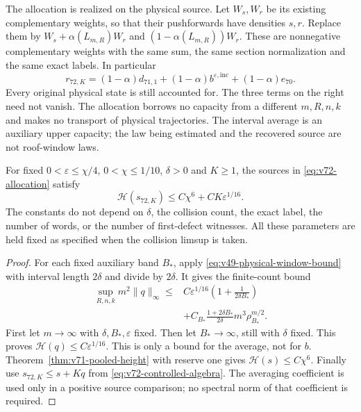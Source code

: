 The allocation is realized on the physical source. Let $W_s,W_r$
be its existing complementary weights, so that their pushforwards
have densities $s,r$. Replace them by
$W_s+\alpha(L_{m,R})W_r$ and
$(1-\alpha(L_{m,R}))W_r$. These are nonnegative complementary
weights with the same sum, the same section normalization and the
same exact labels. In particular
\begin{equation}\label{eq:v72-three-residuals}
 r_{72,K}=(1-\alpha)d_{71,1}
       +(1-\alpha)b^{\varepsilon,\mathrm{inc}}+(1-\alpha)e_{70}.
\end{equation}
Every original physical state is still accounted for. The three terms
on the right need not vanish. The allocation borrows no capacity from
a different $m,R,n,k$ and makes no transport of physical trajectories.
The interval average is an auxiliary upper capacity; the law being
estimated and the recovered source are not roof-window laws.

\begin{theorem}
\label{thm:v72-global-recovery}
For fixed $0<\varepsilon\le\chi/4$, $0<\chi\le1/10$,
$\delta>0$ and $K\ge1$, the sources in
\eqref{eq:v72-allocation} satisfy
\begin{equation}\label{eq:v72-global-controlled-height}
 \mathcal H(s_{72,K})\le C\chi^6+CK\varepsilon^{1/16}.
\end{equation}
The constants do not depend on $\delta$, the collision count, the
exact label, the number of words, or the number of first-defect
witnesses. All these parameters are held fixed as specified when
the collision limsup is taken.
\end{theorem}
\begin{proof}
For each fixed auxiliary band $B_*$, apply
\eqref{eq:v49-physical-window-bound} with interval length $2\delta$
and divide by $2\delta$. It gives the finite-count bound
\begin{equation}\label{eq:v72-finite-average-height}
 \begin{split}
 \sup_{R,n,k}m^2\|q\|_\infty
 \le{}&C\varepsilon^{1/16}\left(1+\frac1{2\delta B_*}\right)\\
 &+C_{B_*}\frac{1+2\delta B_*}{2\delta}
                            m^3\rho_{B_*}^{m/2}.
 \end{split}
\end{equation}
First let $m\to\infty$ with $\delta,B_*,\varepsilon$ fixed.
Then let $B_*\to\infty$, still with $\delta$ fixed. This proves
$\mathcal H(q)\le C\varepsilon^{1/16}$. This is only a bound
for the average, not for $b$. Theorem~\ref{thm:v71-pooled-height}
with reserve one gives $\mathcal H(s)\le C\chi^6$. Finally use
$s_{72,K}\le s+Kq$ from
\eqref{eq:v72-controlled-algebra}. The averaging coefficient is
used only in a positive source comparison; no spectral norm of that
coefficient is required.
\end{proof}

